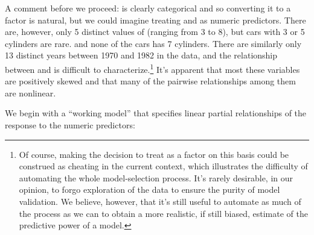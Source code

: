 \documentclass[
]{jss}
\begin{document}
A comment before we proceed:  is clearly categorical and so
converting it to a factor is natural, but we could imagine treating
 and  as numeric predictors. There are,
however, only 5 distinct values of  (ranging from 3 to
8), but cars with 3 or 5 cylinders are rare. and none of the cars has 7
cylinders. There are similarly only 13 distinct years between 1970 and
1982 in the data, and the relationship between  and
 is difficult to characterize.\footnote{Of course, making the
  decision to treat  as a factor on this basis could be
  construed as cheating in the current context, which illustrates the
  difficulty of automating the whole model-selection process. It's
  rarely desirable, in our opinion, to forgo exploration of the data to
  ensure the purity of model validation. We believe, however, that it's
  still useful to automate as much of the process as we can to obtain a
  more realistic, if still biased, estimate of the predictive power of a
  model.} It's apparent that most these variables are positively skewed
and that many of the pairwise relationships among them are nonlinear.

We begin with a ``working model'' that specifies linear partial
relationships of the response to the numeric predictors:
\end{document}
